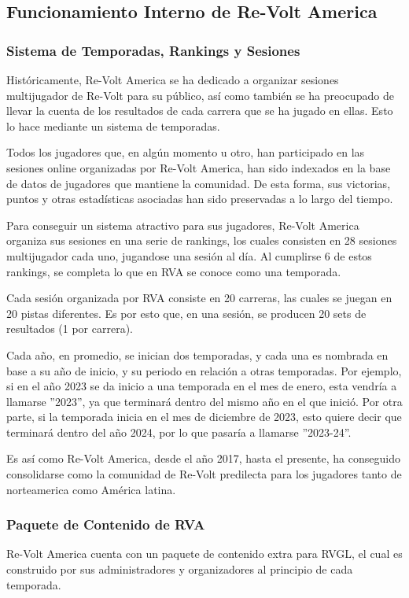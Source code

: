 \subsection{Funcionamiento Interno de Re-Volt America}

\subsubsection{Sistema de Temporadas, Rankings y Sesiones}
Históricamente, Re-Volt America se ha dedicado a organizar sesiones multijugador de Re-Volt para su público, así como también se ha preocupado de llevar la cuenta de los resultados de cada carrera que se ha jugado en ellas. Esto lo hace mediante un sistema de temporadas.

Todos los jugadores que, en algún momento u otro, han participado en las sesiones online organizadas por Re-Volt America, han sido indexados en la base de datos de jugadores que mantiene la comunidad. De esta forma, sus victorias, puntos y otras estadísticas asociadas han sido preservadas a lo largo del tiempo.

Para conseguir un sistema atractivo para sus jugadores, Re-Volt America organiza sus sesiones en una serie de rankings, los cuales consisten en 28 sesiones multijugador cada uno, jugandose una sesión al día. Al cumplirse 6 de estos rankings, se completa lo que en RVA se conoce como una temporada.

Cada sesión organizada por RVA consiste en 20 carreras, las cuales se juegan en 20 pistas diferentes. Es por esto que, en una sesión, se producen 20 sets de resultados (1 por carrera).

Cada año, en promedio, se inician dos temporadas, y cada una es nombrada en base a su año de inicio, y su periodo en relación a otras temporadas. Por ejemplo, si en el año 2023 se da inicio a una temporada en el mes de enero, esta vendría a llamarse ''2023'', ya que terminará dentro del mismo año en el que inició. Por otra parte, si la temporada inicia en el mes de diciembre de 2023, esto quiere decir que terminará dentro del año 2024, por lo que pasaría a llamarse ''2023-24''.

Es así como Re-Volt America, desde el año 2017, hasta el presente, ha conseguido consolidarse como la comunidad de Re-Volt predilecta para los jugadores tanto de norteamerica como América latina.

\subsubsection{Paquete de Contenido de RVA}
Re-Volt America cuenta con un paquete de contenido extra para RVGL, el cual es construido por sus administradores y organizadores al principio de cada temporada.

